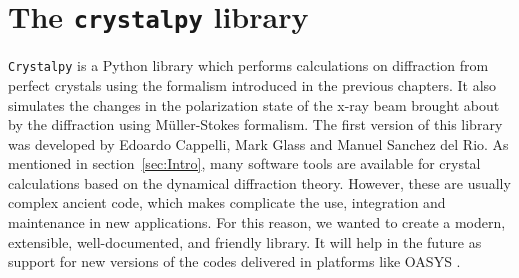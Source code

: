 \documentclass[preprint]{iucr}              %
\newcommand{\inblue}[1]{{\color{blue}#1}}
\begin{document}







%
\section{The {\tt crystalpy} library}
\label{sec:crystalpy}

{\tt Crystalpy} is a Python library which performs calculations on diffraction
from perfect crystals using the formalism introduced in the previous chapters. It also simulates the changes in the polarization state of the x-ray beam brought
about by the diffraction using Müller-Stokes formalism. The first version of this library was developed by Edoardo Cappelli, Mark Glass and Manuel Sanchez del Rio. 
As mentioned in section~\ref{sec:Intro}, many software tools are available for crystal calculations based on the dynamical diffraction theory. However, these are usually complex ancient code, which makes complicate the use, integration and maintenance in new applications. For this reason, we wanted to create a modern, extensible, well-documented, and friendly library. It will help in the future as support for new versions of the codes delivered in platforms like OASYS \cite{codeOASYS}. 
\end{document}
